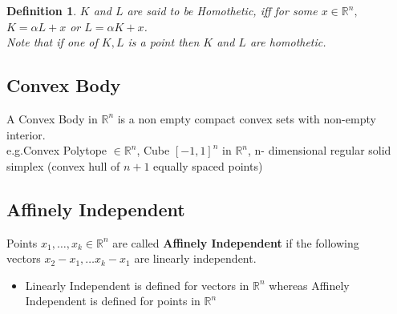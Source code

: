 \documentclass[oneside]{book}
\newtheorem{mydef}{Definition}[section]
\begin{document}
	
	
	
	
	
	
	
	
	
	
	
	
	
	
	
	
	
	
	
	
	
	
	
	
	
	
	
	\begin{mydef} \label{d:1}
		$K$ and $L$ are said to be Homothetic, iff for some $x  \in \mathbb{R}^n,$ \\
		$K = \alpha L + x$ or $L=\alpha K+x $.\\
		Note that if one of $K,L $ is a point then $K $ and $L$ are homothetic.
	\end{mydef}
	
	
	
	
	
	\subsection{Convex Body}
	\label{ss:6}
	A Convex Body in  $\mathbb{R}^n$  is a non empty compact convex sets with non-empty interior.\\
	e.g.Convex Polytope $\in \mathbb{R}^n$, Cube $[-1,1]^{n}$  in $ \mathbb{R}^n$, n- dimensional regular solid simplex (convex hull of $n+1$ equally spaced points) 
	
	
	
	
	
	
	\subsection{Affinely Independent}
	\label{ss:7}
	Points $ x_1, \ldots ,x_k \in \mathbb{R}^n $ are called \textbf{Affinely Independent} if the following \\
	vectors \hspace{1pt}
	$x_{2} - x_{1}, \ldots  x_{k} - x_{1} $ are linearly independent.
	
	\begin{itemize}
		\item Linearly Independent is defined for vectors in $\mathbb{R}^n $ whereas Affinely Independent is defined for points in $\mathbb{R}^n $
	\end{itemize}
	
	
	
\end{document}
